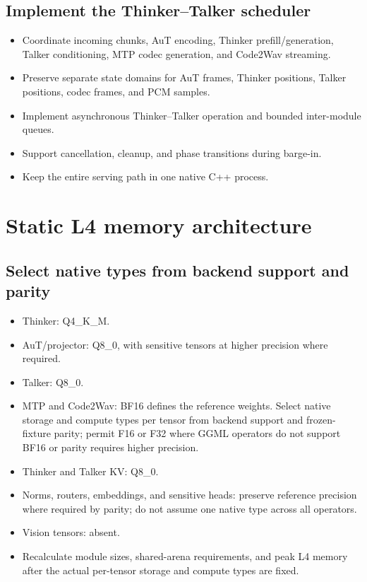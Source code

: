 \documentclass[10pt,letterpaper]{article}
\begin{document}
\subsection{Implement the Thinker--Talker scheduler}
\begin{itemize}
    \item Coordinate incoming chunks, AuT encoding, Thinker prefill/generation, Talker conditioning, MTP codec generation, and Code2Wav streaming.
    \item Preserve separate state domains for AuT frames, Thinker positions, Talker positions, codec frames, and PCM samples.
    \item Implement asynchronous Thinker--Talker operation and bounded inter-module queues.
    \item Support cancellation, cleanup, and phase transitions during barge-in.
    \item Keep the entire serving path in one native C++ process.
\end{itemize}

\section{Static L4 memory architecture}

\subsection{Select native types from backend support and parity}
\begin{itemize}
    \item Thinker: Q4\_K\_M.
    \item AuT/projector: Q8\_0, with sensitive tensors at higher precision where required.
    \item Talker: Q8\_0.
    \item MTP and Code2Wav: BF16 defines the reference weights. Select native storage and compute types per tensor from backend support and frozen-fixture parity; permit F16 or F32 where GGML operators do not support BF16 or parity requires higher precision.
    \item Thinker and Talker KV: Q8\_0.
    \item Norms, routers, embeddings, and sensitive heads: preserve reference precision where required by parity; do not assume one native type across all operators.
    \item Vision tensors: absent.
    \item Recalculate module sizes, shared-arena requirements, and peak L4 memory after the actual per-tensor storage and compute types are fixed.
\end{itemize}
\end{document}
